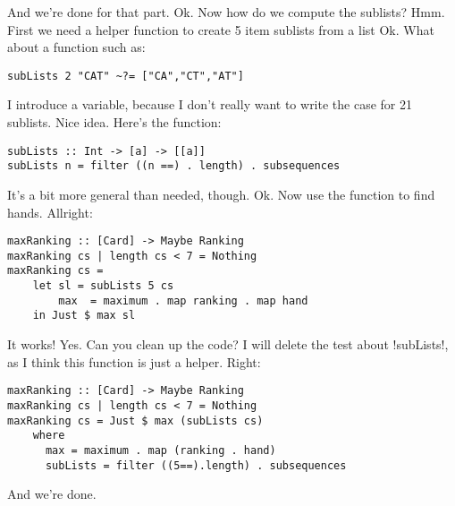 \success And we're done for that part.
\lhN Ok. Now how do we compute the sublists?
\lhA Hmm. First we need a helper function to create 5 item sublists from a list
\lhN Ok. What about a function such as:
\begin{lstlisting}[frame=single]
subLists 2 "CAT" ~?= ["CA","CT","AT"]
\end{lstlisting}
I introduce a variable, because I don't really want to write the case for 21 sublists.
\lhA \error Nice idea. Here's the function:
\begin{lstlisting}[frame=single]
subLists :: Int -> [a] -> [[a]]
subLists n = filter ((n ==) . length) . subsequences 
\end{lstlisting}
\success It's a bit more general than needed, though.
\lhN Ok. Now use the function to find hands.
\lhA Allright:
\begin{lstlisting}[frame=single]
maxRanking :: [Card] -> Maybe Ranking
maxRanking cs | length cs < 7 = Nothing
maxRanking cs = 
    let sl = subLists 5 cs
        max  = maximum . map ranking . map hand
    in Just $ max sl
\end{lstlisting} %
\success It works!
\lhN Yes. Can you clean up the code? I will delete the test about \il!subLists!, as I think this function is just a helper. 
\lhA Right:
\begin{lstlisting}[frame=single]
maxRanking :: [Card] -> Maybe Ranking
maxRanking cs | length cs < 7 = Nothing
maxRanking cs = Just $ max (subLists cs)
    where 
      max = maximum . map (ranking . hand)
      subLists = filter ((5==).length) . subsequences
\end{lstlisting} %
\success And we're done.

\lhend 
